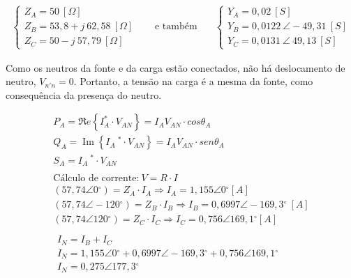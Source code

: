 \documentclass[a4paper,12pt,oneside,openany,table,xcdraw]{article}
\begin{document}
\vspace{-0.5cm}
\begin{equation*}
\begin{aligned}
\begin{cases}
Z_{A} =50\ [ \Omega ]\\
Z_{B} =53,8+j\ 62,58\ [ \Omega ]\\
Z_{C} =50-j\ 57,79\ [ \Omega ]
\end{cases} & \quad \text{e também} \quad  & \begin{cases}
Y_{A} =0,02\ [ S]\\
Y_{B} =0,0122\ \angle -49,31\ [ S]\\
Y_{C} =0,0131\ \angle \ 49,13\ [ S]
\end{cases}
\end{aligned}
\end{equation*}
\vspace{0.2cm}

Como os neutros da fonte e da carga estão conectados, não há deslocamento de neutro, $V_{n'n}=0$. Portanto, a tensão na carga é a mesma da fonte, como consequência da presença do neutro.
\vspace{0.5cm}

\begin{equation*}
\begin{array}{l}
P_{A} =\Re e\left\{I_{A}^{*} \cdotp V_{AN}\right\} =I_{A} V_{AN} \cdotp cos\theta _{A}\\
Q_{A} =\operatorname{Im} \left\{I_{A} \ ^{*} \cdotp V_{AN}\right\} =I_{A} V_{AN} \cdotp sen\theta _{A}\\
S_{A} =I_{A} \ ^{*} \cdotp V_{AN}\\
\\
\text{Cálculo de corrente:}\ V=R\cdotp I\\
\left( 57,74\angle 0\mathrm{^{\circ }}\right) =Z_{A} \cdotp I_{A} \Rightarrow I_{A} =1,155\angle 0\mathrm{^{\circ }}[ A]\\
\left( 57,74\angle -120\mathrm{^{\circ }}\right) =Z_{B} \cdotp I_{B} \Rightarrow I_{B} =0,6997\angle -169,3\mathrm{^{\circ }} \ [ A]\\
\left( 57,74\angle 120\mathrm{^{\circ }}\right) =Z_{C} \cdotp I_{C} \Rightarrow I_{C} =0,756\angle 169,1\mathrm{^{\circ }}[ A]\\
\\
\begin{array}{l}
I_{N} =I_{B} +I_{C}\\
I_{N} =1,155\angle 0\mathrm{^{\circ }} +0,6997\angle -169,3\mathrm{^{\circ }} +0,756\angle 169,1\mathrm{^{\circ }}\\
I_{N} =0,275\angle 177,3\mathrm{^{\circ }}
\end{array}\\
\end{array}
\end{equation*}
\end{document}

